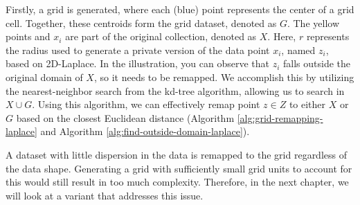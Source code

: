 Firstly, a grid is generated, where each (blue) point represents the center of a grid cell.
Together, these centroids form the grid dataset, denoted as $G$.
The yellow points and $x_i$ are part of the original collection, denoted as $X$.
Here, $r$ represents the radius used to generate a private version of the data point $x_i$, named $z_i$, based on 2D-Laplace.
In the illustration, you can observe that $z_i$ falls outside the original domain of $X$, so it needs to be remapped.
We accomplish this by utilizing the nearest-neighbor search from the kd-tree algorithm, allowing us to search in $X \cup G$.
Using this algorithm, we can effectively remap point $z \in Z$ to either $X$ or $G$ based on the closest Euclidean distance (Algorithm \ref{alg:grid-remapping-laplace} and Algorithm \ref{alg:find-outside-domain-laplace}).

A dataset with little dispersion in the data is remapped to the grid regardless of the data shape. 
Generating a grid with sufficiently small grid units to account for this would still result in too much complexity. 
Therefore, in the next chapter, we will look at a variant that addresses this issue.







